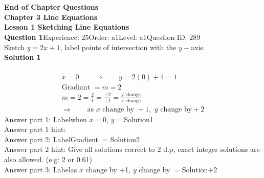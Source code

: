 \documentclass{article}
\begin{document}
\\[4pt]
\\[2pt]
\noindent\large{\textbf{End of Chapter Questions}}\\[15pt]
\noindent\huge{\textbf{Chapter 3 Line Equations}}\\[15pt]
\noindent\huge{\textbf{Lesson 1 Sketching Line Equations}}\\[12pt]
\noindent\textbf{Question 1}\hspace{20pt}Experience: 25\hspace{20pt}Order: a1\hspace{20pt}Level: a1\hspace{20pt}Question-ID: 289\\[2pt]
Sketch $y=2x+1$, label points of intersection with the $y-$axis.\\[4pt]
\noindent\textbf{Solution 1}\\[2pt]
\\[-35pt]\begin{align*}
&x=0\qquad\Rightarrow\qquad y=2(0)+1=1&\\[2pt]
&\text{Gradiant}\,\,=m=2&\\[2pt]
&m=2=\displaystyle\frac{2}{1}=\displaystyle\frac{+2}{+1}=\displaystyle\frac{\text{y change}}{\text{x change}}&\\[2pt]
& \Rightarrow\qquad \text{as}\,\, x \,\,\text{change by } +1,\,\, y\,\, \text{change by} +2 &
\end{align*}
Answer part 1: \hspace{10pt}Label\hspace{10pt}when $x=0$, $y=$\hspace{10pt}Solution\hspace{10pt}1\\
Answer part 1 hint: \hspace{15pt}\\
Answer part 2: \hspace{10pt}Label\hspace{10pt}Gradient $=$\hspace{10pt}Solution\hspace{10pt}2\\
Answer part 2 hint: \hspace{15pt}Give all solutions correct to 2 d.p, exact integer solutions are also allowed. (e.g: 2 or 0.61)\\
Answer part 3: \hspace{10pt}Label\hspace{10pt}as $x$ change by +1, $y$ change by $=$\hspace{10pt}Solution\hspace{10pt}+2\\
\end{document}

